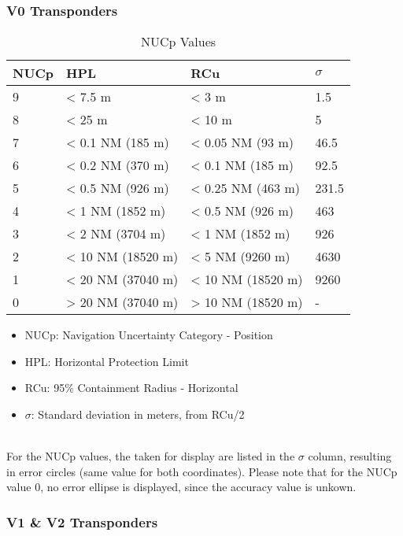 \subsubsection{V0 Transponders}

\begin{table}[H]
  \center
  \begin{tabular}{ | l | l | l | l |}
    \hline
    \textbf{NUCp} & \textbf{HPL} & \textbf{RCu} & \textbf{$\sigma$} \\ \hline
    9   & < 7.5 m            & < 3 m             & 1.5  \\ \hline
    8   & < 25 m             & < 10 m            & 5  \\ \hline
    7   & < 0.1 NM (185 m)   & < 0.05 NM (93 m)  & 46.5  \\ \hline
    6   & < 0.2 NM (370 m)   & < 0.1 NM (185 m)  & 92.5  \\ \hline
    5   & < 0.5 NM (926 m)   & < 0.25 NM (463 m) & 231.5  \\ \hline
    4   & < 1 NM (1852 m)    & < 0.5 NM (926 m)  & 463  \\ \hline
    3   & < 2 NM (3704 m)    & < 1 NM (1852 m)   & 926  \\ \hline
    2   & < 10 NM (18520 m)  & < 5 NM (9260 m)   & 4630  \\ \hline
    1   & < 20 NM (37040 m)  & < 10 NM (18520 m) & 9260  \\ \hline
    0   & > 20 NM (37040 m)  & > 10 NM (18520 m) & -  \\ \hline
  \end{tabular}
  \caption{NUCp Values}
\end{table}

\begin{itemize}
\item NUCp: Navigation Uncertainty Category - Position
\item HPL: Horizontal Protection Limit
\item RCu: 95\% Containment Radius - Horizontal
\item $\sigma$: Standard deviation in meters, from RCu/2
\end{itemize}
\ \\

For the NUCp values, the taken for display are listed in the $\sigma$ column, resulting in error circles (same value for both coordinates). Please note that for the NUCp value 0, no error ellipse is displayed, since the accuracy value is unkown.

\subsubsection{V1 \& V2 Transponders}

